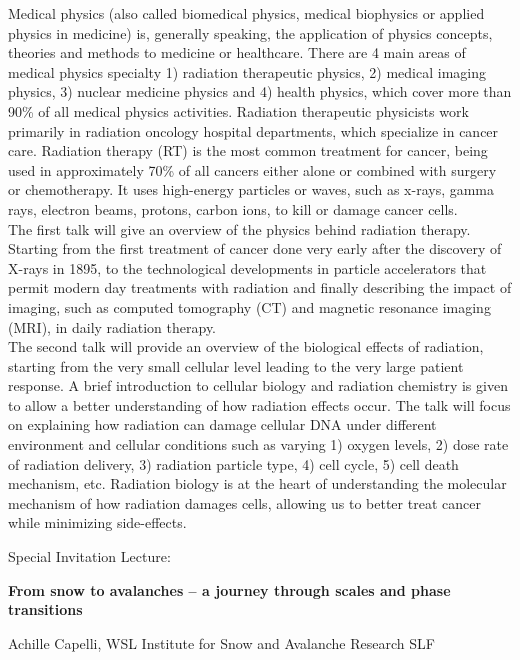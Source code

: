 Medical physics (also called biomedical physics, medical biophysics or applied physics in medicine) is, generally speaking, the application of physics concepts, theories and methods to medicine or healthcare. There are 4 main areas of medical physics specialty 1) radiation therapeutic physics, 2) medical imaging physics, 3) nuclear medicine physics and 4) health physics, which cover more than 90\% of all medical physics activities. Radiation therapeutic physicists work primarily in radiation oncology hospital departments, which specialize in cancer care. Radiation therapy (RT) is the most common treatment for cancer, being used in approximately 70\% of all cancers either alone or combined with surgery or chemotherapy. It uses high-energy particles or waves, such as x-rays, gamma rays, electron beams, protons, carbon ions, to kill or damage cancer cells.
\\
The first talk will give an overview of the physics behind radiation therapy. Starting from the first treatment of cancer done very early after the discovery of X-rays in 1895, to the technological developments in particle accelerators that permit modern day treatments with radiation and finally describing the impact of imaging, such as computed tomography (CT) and magnetic resonance imaging (MRI), in daily radiation therapy.
\\
The second talk will provide an overview of the biological effects of radiation, starting from the very small cellular level leading to the very large patient response. A brief introduction to cellular biology and radiation chemistry is given to allow a better understanding of how radiation effects occur. The talk will focus on explaining how radiation can damage cellular DNA under different environment and cellular conditions such as varying 1) oxygen levels, 2) dose rate of radiation delivery, 3) radiation particle type, 4) cell cycle, 5) cell death mechanism, etc. Radiation biology is at the heart of understanding the molecular mechanism of how radiation damages cells, allowing us to better treat cancer while minimizing side-effects.


\noindent 
\par
\newpage



{{\Large \noindent Special Invitation Lecture: }\par} \medskip

\begin{center}
{{\large\bfseries From snow to avalanches – a journey through scales and phase transitions }\par} \medskip

{\large Achille Capelli, WSL Institute for Snow and Avalanche Research SLF\par}
\end{center}

